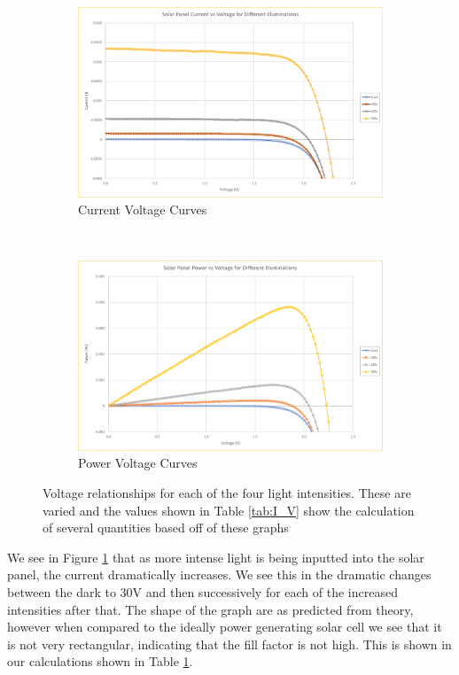 \begin{figure}[ht] 
  \begin{subfigure}[b]{0.90\linewidth}
    \centering
    \includegraphics[width=0.90\linewidth]{figures/I_V_curves.png} 
    \caption{Current Voltage Curves} 
    \label{fig:I_V} 
    \vspace{4ex}
  \end{subfigure}\\%
  \begin{subfigure}[b]{0.90\linewidth}
    \centering
    \includegraphics[width=0.90\linewidth]{figures/P_V_curves.png} 
    \caption{Power Voltage Curves} 
    \label{fig:P_V} 
    \vspace{4ex}
  \end{subfigure} 
  \caption{Voltage relationships for each of the four light intensities. These are varied and the values shown in Table \ref{tab:I_V} show the calculation of several quantities based off of these graphs}
  \label{fig:curves} 
\end{figure}

We see in Figure \ref{fig:I_V} that as more intense light is being inputted into the solar panel, the current dramatically increases. We see this in the dramatic changes between the dark to 30V and then successively for each of the increased intensities after that. The shape of the graph are as predicted from theory, however when compared to the ideally power generating solar cell we see that it is not very rectangular, indicating that the fill factor is not high. This is shown in our calculations shown in Table \ref{fig:I_V}. 

